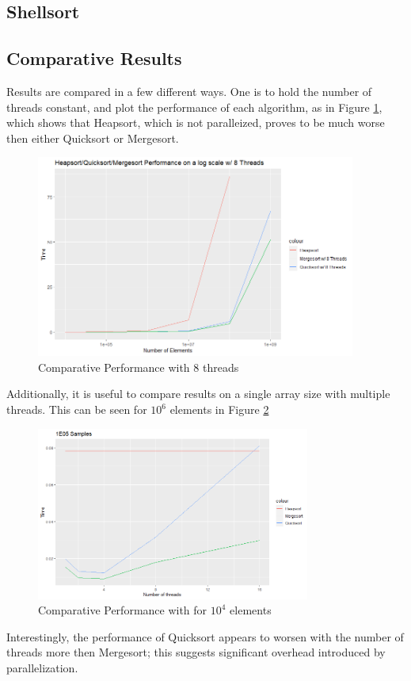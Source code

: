 \documentclass[conference]{IEEEtran}
\begin{document}
\subsection{Shellsort}


\subsection{Comparative Results}
Results are compared in a few different ways. 
One is to hold the number of threads constant, and plot the performance of each algorithm, as in Figure \ref{msqshs}, which shows that Heapsort, which is not paralleized, proves to be much worse then either Quicksort or Mergesort.
\begin{figure}
	\includegraphics[width=10.5cm]{mshsqs.png} 
	\caption{Comparative Performance with 8 threads}
	\label{msqshs}
\end{figure}
Additionally, it is useful to compare results on a single array size with multiple threads. 
This can be seen for $10^6$ elements in Figure \ref{1e5}
\begin{figure}[h]
	\includegraphics[width=9cm]{1e5.png} 
	\caption{Comparative Performance with for $10^4$ elements}
	\label{1e5}
\end{figure}
Interestingly, the performance of Quicksort appears to worsen with the number of threads more then Mergesort; this suggests significant overhead introduced by parallelization. 
\end{document}
